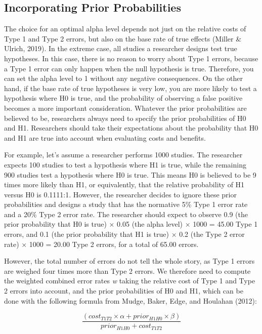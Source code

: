 \documentclass[
  english,
  ,man, a4paper,floatsintext]{apa6}
\begin{document}
\hypertarget{incorporating-prior-probabilities}{%
\subsection{Incorporating Prior Probabilities}\label{incorporating-prior-probabilities}}

The choice for an optimal alpha level depends not just on the relative costs of Type 1 and Type 2 errors, but also on the base rate of true effects (Miller \& Ulrich, 2019). In the extreme case, all studies a researcher designs test true hypotheses. In this case, there is no reason to worry about Type 1 errors, because a Type 1 error can only happen when the null hypothesis is true. Therefore, you can set the alpha level to 1 without any negative consequences. On the other hand, if the base rate of true hypotheses is very low, you are more likely to test a hypothesis where H0 is true, and the probability of observing a false positive becomes a more important consideration. Whatever the prior probabilities are believed to be, researchers always need to specify the prior probabilities of H0 and H1. Researchers should take their expectations about the probability that H0 and H1 are true into account when evaluating costs and benefits.

For example, let's assume a researcher performs 1000 studies. The researcher expects 100 studies to test a hypothesis where H1 is true, while the remaining 900 studies test a hypothesis where H0 is true. This means H0 is believed to be 9 times more likely than H1, or equivalently, that the relative probability of H1 versus H0 is 0.1111:1. However, the researcher decides to ignore these prior probabilities and designs a study that has the normative 5\% Type 1 error rate and a 20\% Type 2 error rate. The researcher should expect to observe 0.9 (the prior probability that H0 is true) × 0.05 (the alpha level) × 1000 = 45.00 Type 1 errors, and 0.1 (the prior probability that H1 is true) × 0.2 (the Type 2 error rate) × 1000 = 20.00 Type 2 errors, for a total of 65.00 errors.

However, the total number of errors do not tell the whole story, as Type 1 errors are weighed four times more than Type 2 errors. We therefore need to compute the weighted combined error rates \emph{w} taking the relative cost of Type 1 and Type 2 errors into account, and the prior probabilities of H0 and H1, which can be done with the following formula from Mudge, Baker, Edge, and Houlahan (2012):

\begin{equation}
\frac{(cost_{T1T2} \times \alpha + prior_{H1H0} \times \beta)}{prior_{H1H0}+cost_{T1T2}}
\label{eq:minimize}
\end{equation}
\end{document}
